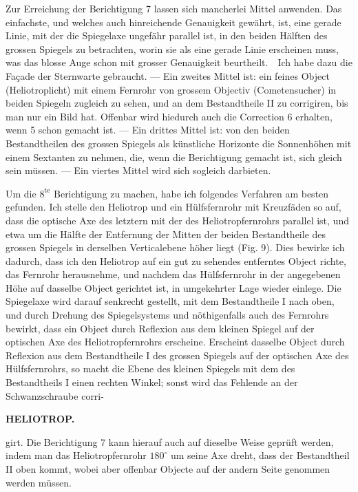 \par\noindent\hspace*{\parindent}Zur Erreichung der Berichtigung 7 lassen sich mancherlei Mittel anwenden. Das einfachste, und welches auch hinreichende Genauigkeit gewährt, ist, eine gerade Linie, mit der die Spiegelaxe ungefähr parallel ist, in den beiden Hälften des grossen Spiegels zu betrachten, worin sie als eine gerade Linie erscheinen muss, was das blosse Auge schon mit grosser Genauigkeit beurtheilt.\ \ Ich habe dazu die Façade der Sternwarte gebraucht. --- Ein zweites Mittel ist: ein feines Object (Heliotroplicht) mit einem Fernrohr von grossem Objectiv (Cometensucher) in beiden Spiegeln zugleich zu sehen, und an dem Bestandtheile II zu corrigiren, bis man nur ein Bild hat. Offenbar wird hiedurch auch die Correction 6 erhalten, wenn 5 schon gemacht ist. --- Ein drittes Mittel ist: von den beiden Bestandtheilen des grossen Spiegels als künstliche Horizonte die Sonnenhöhen mit einem Sextanten zu nehmen, die, wenn die Berichtigung gemacht ist, sich gleich sein müssen. --- Ein viertes Mittel wird sich sogleich darbieten.

\par\noindent\hspace*{\parindent}Um die $8^{\mathrm{te}}$ Berichtigung zu machen, habe ich folgendes Verfahren am besten gefunden. Ich stelle den Heliotrop und ein Hülfsfernrohr mit Kreuzfäden so auf, dass die optische Axe des letztern mit der des Heliotropfernrohrs parallel ist, und etwa um die Hälfte der Entfernung der Mitten der beiden Bestandtheile des grossen Spiegels in derselben Verticalebene höher liegt (Fig. 9). Dies bewirke ich dadurch, dass ich den Heliotrop auf ein gut zu sehendes entferntes Object richte, das Fernrohr herausnehme, und nachdem das Hülfsfernrohr in der angegebenen Höhe auf dasselbe Object gerichtet ist, in umgekehrter Lage wieder einlege. Die Spiegelaxe wird darauf senkrecht gestellt, mit dem Bestandtheile I nach oben, und durch Drehung des Spiegelsystems und nöthigenfalls auch des Fernrohrs bewirkt, dass ein Object durch Reflexion aus dem kleinen Spiegel auf der optischen Axe des Heliotropfernrohrs erscheine. Erscheint dasselbe Object durch Reflexion aus dem Bestandtheile I des grossen Spiegels auf der optischen Axe des Hülfsfernrohrs, so macht die Ebene des kleinen Spiegels mit dem des Bestandtheils I einen rechten Winkel; sonst wird das Fehlende an der Schwanzschraube corri-

\par\clearpage
\noindent\null\hfill{\small\textbf{HELIOTROP.}}\hfill{}\par\medskip
\noindent girt. Die Berichtigung 7 kann hierauf auch auf dieselbe Weise geprüft werden, indem man das Heliotropfernrohr $180^\circ$ um seine Axe dreht, dass der Bestandtheil II oben kommt, wobei aber offenbar Objecte auf der andern Seite genommen werden müssen.

